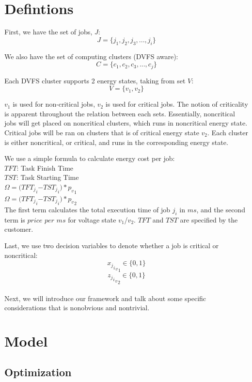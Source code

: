 \documentclass[conference]{IEEEtran}
\begin{document}
\section{Defintions}
First, we have the set of jobs, $J$:
$$J =\{j_1,j_2,j_3, ..., j_i\}$$

We also have the set of computing clusters (DVFS aware):
$$C =\{c_1,c_2,c_3, ..., c_j\}$$

Each DVFS cluster supports 2 energy states, taking from set $V$:
$$V =\{v_1,v_2\}$$

$v_1$ is used for non-critical jobs, $v_2$ is used for critical jobs. The notion of criticality is apparent throughout the relation between each sets. Essentially, noncritical jobs will get placed on noncritical clusters, which runs in noncritical energy state. Critical jobs will be ran on clusters that is of critical energy state $v_2$. Each cluster is either noncritical, or critical, and runs in the corresponding energy state.

We use a simple formula to calculate energy cost per job:\\

$TFT$: Task Finish Time\\
\indent $TST$: Task Starting Time\\

$\Omega = ($${{TFT_j}_i}$$ - $${{TST_j}_i}$$)*$${{p_v}_1}$$ $\\
\indent $\Omega = ($${{TFT_j}_i}$$ - $${{TST_j}_i}$$)*$${{p_v}_2}$$ $\\

The first term calculates the total execution time of job $j_i$ in $ms$, and the second term is $price$ $per$ $ms$ for voltage state $v_1$/$v_2$. $TFT$ and $TST$ are specified by the customer.

Last, we use two decision variables to denote whether a job is critical or noncritical:
$${{{{x_j}_i}_v}_1}\in \{0,1\}$$
$${{{{z_j}_i}_v}_2}\in \{0,1\}$$\\
Next, we will introduce our framework and talk about some specific considerations that is nonobvious and nontrivial.

\section{Model}
\subsection{Optimization}
\end{document}
